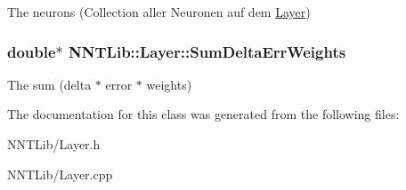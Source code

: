The neurons (Collection aller Neuronen auf dem \hyperlink{class_n_n_t_lib_1_1_layer}{Layer}) 

\hypertarget{class_n_n_t_lib_1_1_layer_a655484beac27344f2ced3bc77a9f160f}{}
\subsubsection[{Sum\+Delta\+Err\+Weights}]{\setlength{\rightskip}{0pt plus 5cm}double$\ast$ N\+N\+T\+Lib\+::\+Layer\+::\+Sum\+Delta\+Err\+Weights}\label{class_n_n_t_lib_1_1_layer_a655484beac27344f2ced3bc77a9f160f}


The sum (delta $\ast$ error $\ast$ weights) 



The documentation for this class was generated from the following files\+:\begin{DoxyCompactItemize}
\item 
N\+N\+T\+Lib/Layer.\+h\item 
N\+N\+T\+Lib/Layer.\+cpp\end{DoxyCompactItemize}
